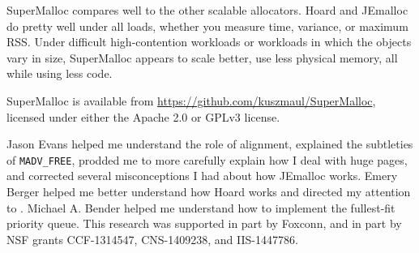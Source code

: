 \documentclass[natbib,sort&compress,10pt]{sigplanconf}
\newcommand{\code}[1]{\texttt{#1}}
\begin{document}



SuperMalloc compares well to the other scalable allocators.  Hoard and
JEmalloc do pretty well under all loads, whether you measure time,
variance, or maximum RSS.  Under difficult high-contention workloads
or workloads in which the objects vary in size, SuperMalloc appears to
scale better, use less physical memory, all while using less code.

SuperMalloc is available from
\url{https://github.com/kuszmaul/SuperMalloc}, licensed under either
the Apache 2.0 or GPLv3 license.

\acks

Jason Evans helped me understand the role of alignment, explained the
subtleties of \code{MADV\_FREE}, prodded me to more carefully explain
how I deal with huge pages, and corrected several misconceptions I had
about how JEmalloc works.  Emery Berger helped me better understand
how Hoard works and directed my attention to \cite{HertzFeBe05,
  YangBeKa06}.  Michael A. Bender helped me understand how to
implement the fullest-fit priority queue.  This research was supported
in part by Foxconn, and in part by NSF grants CCF-1314547,
CNS-1409238, and IIS-1447786.

{\raggedright

\renewcommand{\bibfont}{\normalsize}

}

\end{document}
